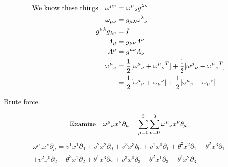 \documentclass{article}
\begin{document}
\begin{align*}
	\qq*{We know these things}\omega^{\mu\nu} & ={\omega^\mu}_\lambda g^{\lambda\nu}                                                                   \\
	\omega_{\mu\nu}                           & = g_{\mu\lambda} {\omega^\lambda}_\nu                                                                  \\
	g^{\mu\lambda}g_{\lambda\nu}              & = I                                                                                                    \\
	A_\mu                                     & =g_{\mu\nu}A^\nu                                                                                       \\
	A^\mu                                     & =g^{\mu\nu}A_\nu                                                                                       \\
	{\omega^\mu}_\nu                          & =\frac{1}{2}[{\omega^\mu}_\nu+{{\omega^\mu}_\nu}^T]+\frac{1}{2}[{\omega^\mu}_\nu-{{\omega^\mu}_\nu}^T] \\
	                                          & =\frac{1}{2}[{\omega^\mu}_\nu+{\omega_\mu}^\nu]+\frac{1}{2}[{\omega^\mu}_\nu-{\omega_\mu}^\nu]
\end{align*}


Brute force.

\[\qq*{Examine}{\omega^\mu}_\nu x^\nu \partial_\mu=\sum^3_{\mu=0}\sum^3_{\nu=0}{\omega^\mu}_\nu x^\nu \partial_\mu\]
\begin{multline*}
	{\omega^\mu}_\nu x^\nu \partial_\mu=
	v^1 x^1 \partial_0+v^2 x^2 \partial_0+v^3 x^3 \partial_0+
	v^1 x^0 \partial_1+\theta^3 x^2 \partial_1-\theta^2 x^3 \partial_1\\+ 
	v^2 x^0 \partial_2-\theta^3 x^1 \partial_2+\theta^1 x^3 \partial_2+
	v^3 x^0 \partial_3+\theta^2 x^1 \partial_3-\theta^1 x^2 \partial_3
\end{multline*}
\end{document}
